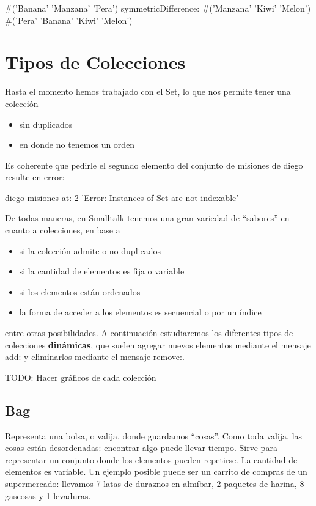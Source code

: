 \documentclass[a4paper,12pt]{book}
\begin{document}
\begin{code}
#('Banana' 'Manzana' 'Pera') 
      symmetricDifference: #('Manzana' 'Kiwi' 'Melon')
      #('Pera' 'Banana' 'Kiwi' 'Melon')
\end{code}

\section{Tipos de Colecciones}
Hasta el momento hemos trabajado con el Set, lo que nos permite tener una colección

\begin{itemize}
 \item sin duplicados
 \item en donde no tenemos un orden
\end{itemize}

Es coherente que pedirle el segundo elemento del conjunto de misiones de diego resulte en error:

\begin{code}
diego misiones at: 2
  'Error: Instances of Set are not indexable'
\end{code}

De todas maneras, en Smalltalk tenemos una gran variedad de ``sabores'' en cuanto a colecciones, en base a

\begin{itemize}
 \item si la colección admite o no duplicados
 \item si la cantidad de elementos es fija o variable
 \item si los elementos están ordenados
 \item la forma de acceder a los elementos es secuencial o por un índice
\end{itemize}

entre otras posibilidades. A continuación estudiaremos los diferentes tipos de colecciones \textbf{dinámicas}, que
suelen agregar nuevos elementos mediante el mensaje add: y eliminarlos mediante el mensaje remove:.

TODO: Hacer gráficos de cada colección

\subsection{Bag}

Representa una bolsa, o valija, donde guardamos ``cosas''. Como toda valija, las cosas están desordenadas: 
encontrar algo puede llevar tiempo. Sirve para representar un conjunto donde los elementos pueden 
repetirse. La cantidad de elementos es variable. Un ejemplo posible puede ser un carrito de compras 
de un supermercado: llevamos 7 latas de duraznos en almíbar, 2 paquetes de harina, 8 gaseosas y 1 levaduras. 
\end{document}
